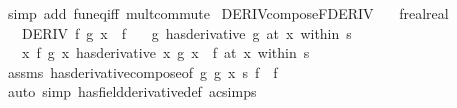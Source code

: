 \begin{isabellebody}
\ {\isacharparenleft}{\kern0pt}simp\ add{\isacharcolon}{\kern0pt}\ fun{\isacharunderscore}{\kern0pt}eq{\isacharunderscore}{\kern0pt}iff\ mult{\isachardot}{\kern0pt}commute{\isacharparenright}{\kern0pt}%
\endisatagproof
{\isafoldproof}%
%
\isadelimproof
\isanewline
%
\endisadelimproof
\isanewline
{}\isamarkupfalse%
\ DERIV{\isacharunderscore}{\kern0pt}compose{\isacharunderscore}{\kern0pt}FDERIV{\isacharcolon}{\kern0pt}\isanewline
\ \ \ f{\isacharcolon}{\kern0pt}{\isacharcolon}{\kern0pt}{\isachardoublequoteopen}real{\isasymRightarrow}real{\isachardoublequoteclose}\isanewline
\ \ \ {\isachardoublequoteopen}DERIV\ f\ {\isacharparenleft}{\kern0pt}g\ x{\isacharparenright}{\kern0pt}\ {\isacharcolon}{\kern0pt}{\isachargreater}{\kern0pt}\ f{\isacharprime}{\kern0pt}{\isachardoublequoteclose}\isanewline
\ \ \ {\isachardoublequoteopen}{\isacharparenleft}{\kern0pt}g\ has{\isacharunderscore}{\kern0pt}derivative\ g{\isacharprime}{\kern0pt}{\isacharparenright}{\kern0pt}\ {\isacharparenleft}{\kern0pt}at\ x\ within\ s{\isacharparenright}{\kern0pt}{\isachardoublequoteclose}\isanewline
\ \ \ {\isachardoublequoteopen}{\isacharparenleft}{\kern0pt}{\isacharparenleft}{\kern0pt}{\isasymlambda}x{\isachardot}{\kern0pt}\ f\ {\isacharparenleft}{\kern0pt}g\ x{\isacharparenright}{\kern0pt}{\isacharparenright}{\kern0pt}\ has{\isacharunderscore}{\kern0pt}derivative\ {\isacharparenleft}{\kern0pt}{\isasymlambda}x{\isachardot}{\kern0pt}\ g{\isacharprime}{\kern0pt}\ x\ {\isacharasterisk}{\kern0pt}\ f{\isacharprime}{\kern0pt}{\isacharparenright}{\kern0pt}{\isacharparenright}{\kern0pt}\ {\isacharparenleft}{\kern0pt}at\ x\ within\ s{\isacharparenright}{\kern0pt}{\isachardoublequoteclose}\isanewline
%
\isadelimproof
\ \ %
\endisadelimproof
%
\isatagproof
{}\isamarkupfalse%
\ assms\ has{\isacharunderscore}{\kern0pt}derivative{\isacharunderscore}{\kern0pt}compose{\isacharbrackleft}{\kern0pt}of\ g\ g{\isacharprime}{\kern0pt}\ x\ s\ f\ {\isachardoublequoteopen}{\isacharparenleft}{\kern0pt}{\isacharasterisk}{\kern0pt}{\isacharparenright}{\kern0pt}\ f{\isacharprime}{\kern0pt}{\isachardoublequoteclose}{\isacharbrackright}{\kern0pt}\isanewline
\ \ \isamarkupfalse%
\ {\isacharparenleft}{\kern0pt}auto\ simp{\isacharcolon}{\kern0pt}\ has{\isacharunderscore}{\kern0pt}field{\isacharunderscore}{\kern0pt}derivative{\isacharunderscore}{\kern0pt}def\ ac{\isacharunderscore}{\kern0pt}simps{\isacharparenright}{\kern0pt}%
\endisatagproof
{\isafoldproof}%
%
\isadelimproof
%
\endisadelimproof
%
\isadelimdocument

\end{isabellebody}
